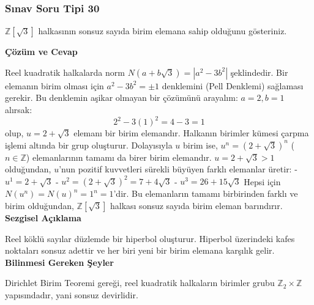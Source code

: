\documentclass[11pt, a4paper]{article}
\newenvironment{cozum}{
    \vspace{0.5cm}
    \noindent\textcolor{green!60!black}{\faCheckCircle\enspace \textbf{\Large Çözüm ve Cevap}}\par\vspace{0.2cm}
}{}
\newenvironment{sezgisel}{
    \vspace{0.5cm}
    \noindent\textcolor{orange!80!black}{\faLightbulb\enspace \textbf{\Large Sezgisel Açıklama}}\par\vspace{0.2cm}
    \itshape
}{}
\newenvironment{bilgi}{
    \vspace{0.5cm}
    \noindent\textcolor{red!70!black}{\faExclamationTriangle\enspace \textbf{\Large Bilinmesi Gereken Şeyler}}\par\vspace{0.2cm}
}{}
\begin{document}
\subsubsection{Sınav Soru Tipi 30}
\begin{sinavbox}
$\mathbb{Z}[\sqrt{3}]$ halkasının sonsuz sayıda birim elemana sahip olduğunu gösteriniz.
\end{sinavbox}
\begin{cozum}
Reel kuadratik halkalarda norm $N(a+b\sqrt{3}) = |a^2-3b^2|$ şeklindedir. Bir elemanın birim olması için $a^2-3b^2 = \pm 1$ denklemini (Pell Denklemi) sağlaması gerekir.
Bu denklemin aşikar olmayan bir çözümünü arayalım:
$a = 2, b = 1$ alırsak:
\[ 2^2 - 3(1)^2 = 4 - 3 = 1 \]
olup, $u = 2+\sqrt{3}$ elemanı bir birim elemandır.
Halkanın birimler kümesi çarpma işlemi altında bir grup oluşturur. Dolayısıyla $u$ birim ise, $u^n = (2+\sqrt{3})^n$ ($n \in \mathbb{Z}$) elemanlarının tamamı da birer birim elemandır.
$u = 2+\sqrt{3} > 1$ olduğundan, $u$'nun pozitif kuvvetleri sürekli büyüyen farklı elemanlar üretir:
- $u^1 = 2+\sqrt{3}$
- $u^2 = (2+\sqrt{3})^2 = 7+4\sqrt{3}$
- $u^3 = 26+15\sqrt{3}$
Hepsi için $N(u^n) = N(u)^n = 1^n = 1$'dir.
Bu elemanların tamamı birbirinden farklı ve birim olduğundan, $\mathbb{Z}[\sqrt{3}]$ halkası sonsuz sayıda birim eleman barındırır.
\end{cozum}
\begin{sezgisel}
Reel köklü sayılar düzlemde bir hiperbol oluşturur. Hiperbol üzerindeki kafes noktaları sonsuz adettir ve her biri yeni bir birim elemana karşılık gelir.
\end{sezgisel}
\begin{bilgi}
Dirichlet Birim Teoremi gereği, reel kuadratik halkaların birimler grubu $\mathbb{Z}_2 \times \mathbb{Z}$ yapısındadır, yani sonsuz devirlidir.
\end{bilgi}
\end{document}
